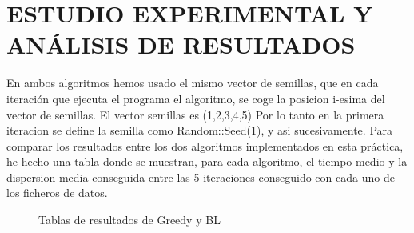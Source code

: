 \documentclass{article}
\begin{document}
\newpage 

\newpage
\section {\large ESTUDIO EXPERIMENTAL Y ANÁLISIS DE RESULTADOS}
En ambos algoritmos hemos usado el mismo vector de semillas, que en cada iteración 
que ejecuta el programa el algoritmo, se coge la posicion i-esima del vector de semillas.
\newline El vector semillas es (1,2,3,4,5)
Por lo tanto en la primera iteracion se define la semilla como Random::Seed(1), y asi 
sucesivamente.
\newline Para comparar los resultados entre los dos algoritmos implementados en esta práctica, he hecho 
una tabla donde se muestran, para cada algoritmo, el tiempo medio y la dispersion media conseguida entre 
las 5 iteraciones conseguido con cada uno de los ficheros de datos.

\vspace{10mm}
\begin{figure}[h]
  \centering
  \caption{Tablas de resultados de Greedy y BL}
\end{figure}
\end{document}
